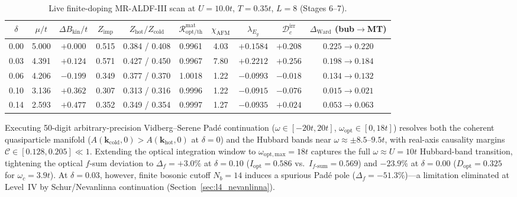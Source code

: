 \documentclass[11pt,a4paper]{article}
\numberwithin{equation}{section}
\theoremstyle{plain}
\theoremstyle{definition}
\providecommand{\vk}{\mathbf{k}}
\begin{document}
\begin{table}[htbp]
\centering
\renewcommand{\arraystretch}{1.16}
\caption{Live finite-doping MR-ALDF-III scan at $U = 10.0t$, $T = 0.35t$, $L = 8$ (Stages 6--7).}
\label{tab:live_s67}
\vspace{0.4em}
\footnotesize
\setlength{\tabcolsep}{4.5pt}
\begin{tabular}{cccccccccc}
\toprule
$\delta$ & $\mu/t$ & $\Delta B_{\mathrm{kin}}/t$ & $Z_{\mathrm{imp}}$ & $Z_{\mathrm{hot}}/Z_{\mathrm{cold}}$ & $\mathcal{R}_{\mathrm{opt/th}}^{\mathrm{mat}}$ & $\chi_{\mathrm{AFM}}$ & $\lambda_{E_g}$ & $\mathcal{D}_c^{\mathrm{irr}}$ & $\Delta_{\mathrm{Ward}}$ (bub$\to$MT) \\
\midrule
0.00 & 5.000 & $+0.000$ & 0.515 & 0.384 / 0.408 & 0.9961 & 4.03 & $+0.1584$ & $+0.208$ & $0.225 \to 0.220$ \\
0.03 & 4.391 & $+0.124$ & 0.571 & 0.427 / 0.450 & 0.9967 & 7.80 & $+0.2212$ & $+0.256$ & $0.198 \to 0.184$ \\
0.06 & 4.206 & $-0.199$ & 0.349 & 0.377 / 0.370 & 1.0018 & 1.22 & $-0.0993$ & $-0.018$ & $0.134 \to 0.132$ \\
0.10 & 3.136 & $+0.362$ & 0.307 & 0.313 / 0.316 & 0.9996 & 1.22 & $-0.0915$ & $-0.076$ & $0.015 \to 0.021$ \\
0.14 & 2.593 & $+0.477$ & 0.352 & 0.349 / 0.354 & 0.9997 & 1.27 & $-0.0935$ & $+0.024$ & $0.053 \to 0.063$ \\
\bottomrule
\end{tabular}
\end{table}

Executing 50-digit arbitrary-precision Vidberg--Serene Pad\'e continuation
($\omega \in [-20t, 20t]$, $\omega_{\mathrm{opt}} \in [0, 18t]$) resolves both the
coherent quasiparticle manifold ($A(\vk_{\mathrm{cold}}, 0) > A(\vk_{\mathrm{hot}}, 0)$
at $\delta = 0$) and the Hubbard bands near $\omega \approx \pm 8.5\text{--}9.5t$, with
real-axis causality margins $\mathcal{C} \in [0.128, 0.205] \ll 1$. Extending the optical
integration window to $\omega_{\mathrm{opt,max}} = 18t$ captures the full
$\omega \approx U = 10t$ Hubbard-band transition, tightening the optical $f$-sum
deviation to $\Delta_f = +3.0\%$ at $\delta = 0.10$ ($I_{\mathrm{opt}} = 0.586$ vs.\
$I_{f\text{-sum}} = 0.569$) and $-23.9\%$ at $\delta = 0.00$ ($D_{\mathrm{opt}} = 0.325$
for $\omega_c = 3.9t$). At $\delta = 0.03$, however, finite bosonic cutoff $N_b = 14$
induces a spurious Pad\'e pole ($\Delta_f = -51.3\%$)---a limitation eliminated at Level~IV
by Schur/Nevanlinna continuation (Section~\ref{sec:l4_nevanlinna}).
\end{document}
